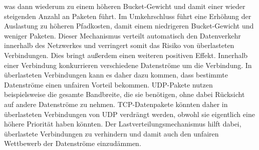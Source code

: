 was dann wiederum zu einem höheren Bucket-Gewicht und damit einer wieder steigenden Anzahl an Paketen führt. Im Umkehrschluss führt eine Erhöhung der Auslastung zu höheren Pfadkosten, damit einem niedrigeren Bucket-Gewicht 
und weniger Paketen. Dieser Mechanismus verteilt automatisch den Datenverkehr innerhalb des Netzwerkes und verringert somit das Risiko von überlasteten Verbindungen. Dies bringt außerdem einen weiteren positiven Effekt. 
Innerhalb einer Verbindung konkurrieren verschiedene Datenströme um die Verbindung. In überlasteten Verbindungen kann es daher dazu kommen, dass bestimmte Datenströme einen unfairen Vorteil bekommen. 
\ac{UDP}-Pakete nutzen beispielsweise die gesamte Bandbreite, die sie benötigen, ohne dabei Rücksicht auf andere Datenströme zu nehmen. \ac{TCP}-Datenpakete könnten daher in überlasteten Verbindungen von \ac{UDP} verdrängt werden, 
obwohl sie eigentlich eine höhere Priorität haben könnten. Der Lastverteilungsmechanismus hilft dabei, überlastete Verbindungen zu verhindern und damit auch den unfairen Wettbewerb der Datenströme einzudämmen.

